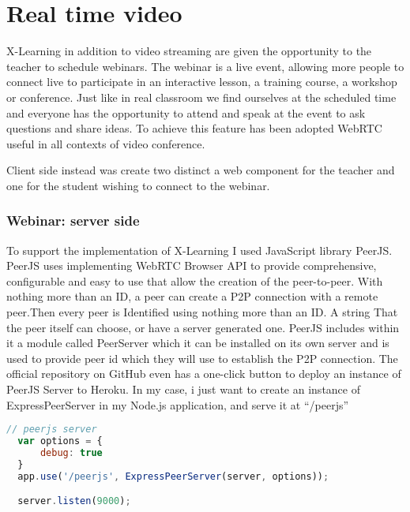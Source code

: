 \newpage
\section{Real time video}
\label{sec:RealTimeVideo}

X-Learning in addition to video streaming are given the opportunity to the teacher to schedule webinars.
The webinar is a live event, allowing more people to connect live to participate in an interactive lesson, a training course, a workshop or conference. Just like in real classroom we find ourselves at the scheduled time and everyone has the opportunity to attend and speak at the event to ask questions and share ideas.
To achieve this feature has been adopted WebRTC useful in all contexts of video conference.


 Client side instead was create two distinct a web component for the teacher and one for the student wishing to connect to the webinar.

\subsubsection{Webinar: server side}
To support the implementation of X-Learning I used JavaScript library PeerJS.
PeerJS uses implementing WebRTC
Browser API to provide comprehensive, configurable and easy to use that allow the creation of the peer-to-peer. With nothing more than an ID, a peer can create a P2P connection with a remote peer.Then every peer is Identified using nothing more than an ID. A string That the peer itself can choose, or have a server generated one.
PeerJS includes within it a module called PeerServer which it can be installed on its own server and is used to provide peer id which they will use to establish the P2P connection. The official repository on GitHub even has a one-click button to deploy an instance of PeerJS Server to Heroku.
In my case, i just want to create an instance of ExpressPeerServer in my Node.js application, and serve it at “/peerjs”


\begin{lstlisting}[language=javascript]
// peerjs server
  var options = {
      debug: true
  }
  app.use('/peerjs', ExpressPeerServer(server, options));

  server.listen(9000);
\end{lstlisting}



